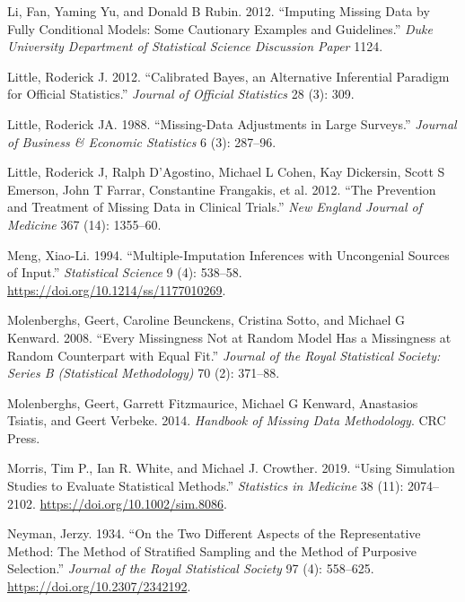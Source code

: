 \documentclass[
]{article}
\newlength{\cslhangindent}
\newlength{\cslentryspacingunit} %
\newenvironment{CSLReferences}[2] %
 {%
  \setlength{\parindent}{0pt}
  \ifodd #1
  \let\oldpar\par
  \def\par{\hangindent=\cslhangindent\oldpar}
  \fi
  \setlength{\parskip}{#2\cslentryspacingunit}
 }%
 {}
\begin{document}
\begin{CSLReferences}{1}{0}
\leavevmode{}%
Li, Fan, Yaming Yu, and Donald B Rubin. 2012. {``Imputing Missing Data
by Fully Conditional Models: {Some} Cautionary Examples and
Guidelines.''} \emph{Duke University Department of Statistical Science
Discussion Paper} 1124.

\leavevmode{}%
Little, Roderick J. 2012. {``Calibrated {Bayes}, an Alternative
Inferential Paradigm for Official Statistics.''} \emph{Journal of
Official Statistics} 28 (3): 309.

\leavevmode{}%
Little, Roderick JA. 1988. {``Missing-Data Adjustments in Large
Surveys.''} \emph{Journal of Business \& Economic Statistics} 6 (3):
287--96.

\leavevmode{}%
Little, Roderick J, Ralph D'Agostino, Michael L Cohen, Kay Dickersin,
Scott S Emerson, John T Farrar, Constantine Frangakis, et al. 2012.
{``The Prevention and Treatment of Missing Data in Clinical Trials.''}
\emph{New England Journal of Medicine} 367 (14): 1355--60.

\leavevmode{}%
Meng, Xiao-Li. 1994. {``Multiple-{Imputation Inferences} with
{Uncongenial Sources} of {Input}.''} \emph{Statistical Science} 9 (4):
538--58. \url{https://doi.org/10.1214/ss/1177010269}.

\leavevmode{}%
Molenberghs, Geert, Caroline Beunckens, Cristina Sotto, and Michael G
Kenward. 2008. {``Every Missingness Not at Random Model Has a
Missingness at Random Counterpart with Equal Fit.''} \emph{Journal of
the Royal Statistical Society: Series B (Statistical Methodology)} 70
(2): 371--88.

\leavevmode{}%
Molenberghs, Geert, Garrett Fitzmaurice, Michael G Kenward, Anastasios
Tsiatis, and Geert Verbeke. 2014. \emph{Handbook of Missing Data
Methodology}. {CRC Press}.

\leavevmode{}%
Morris, Tim P., Ian R. White, and Michael J. Crowther. 2019. {``Using
Simulation Studies to Evaluate Statistical Methods.''} \emph{Statistics
in Medicine} 38 (11): 2074--2102.
\url{https://doi.org/10.1002/sim.8086}.

\leavevmode{}%
Neyman, Jerzy. 1934. {``On the {Two Different Aspects} of the
{Representative Method}: {The Method} of {Stratified Sampling} and the
{Method} of {Purposive Selection}.''} \emph{Journal of the Royal
Statistical Society} 97 (4): 558--625.
\url{https://doi.org/10.2307/2342192}.


\end{CSLReferences}
\end{document}
